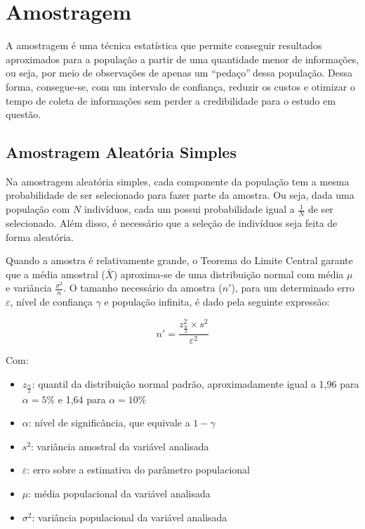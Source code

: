 \documentclass[
]{estat/estat}
\providecommand{\tightlist}{%
  \setlength{\itemsep}{0pt}\setlength{\parskip}{0pt}}\usepackage{longtable,booktabs,array}
\begin{document}
\section{Amostragem}\label{amostragem}

A amostragem é uma técnica estatística que permite conseguir resultados
aproximados para a população a partir de uma quantidade menor de
informações, ou seja, por meio de observações de apenas um
``pedaço''\(\:\)dessa população. Dessa forma, consegue-se, com um
intervalo de confiança, reduzir os custos e otimizar o tempo de coleta
de informações sem perder a credibilidade para o estudo em questão.

\subsection{Amostragem Aleatória
Simples}\label{amostragem-aleatuxf3ria-simples}

Na amostragem aleatória simples, cada componente da população tem a
mesma probabilidade de ser selecionado para fazer parte da amostra. Ou
seja, dada uma população com \(N\) indivíduos, cada um possui
probabilidade igual a \(\frac{1}{N}\) de ser selecionado. Além disso, é
necessário que a seleção de indivíduos seja feita de forma aleatória.

Quando a amostra é relativamente grande, o Teorema do Limite Central
garante que a média amostral (\(\bar{X}\)) aproxima-se de uma
distribuição normal com média \(\mu\) e variância
\(\frac{\sigma^2}{n}\). O tamanho necessário da amostra (\(n'\)), para
um determinado erro \(\varepsilon\), nível de confiança \(\gamma\) e
população infinita, é dado pela seguinte expressão:

\[
n' = \frac{z^2_{\frac{\alpha}{2}} \times s^2}{\varepsilon^2}
\]

Com:

\begin{itemize}
\tightlist
\item
  \(z_{\frac{\alpha}{2}}\): quantil da distribuição normal padrão,
  aproximadamente igual a 1,96 para \(\alpha = 5\%\) e 1,64 para
  \(\alpha = 10\%\)
\item
  \(\alpha\): nível de significância, que equivale a \(1 - \gamma\)
\item
  \(s^2\): variância amostral da variável analisada
\item
  \(\varepsilon\): erro sobre a estimativa do parâmetro populacional
\item
  \(\mu\): média populacional da variável analisada
\item
  \(\sigma^2\): variância populacional da variável analisada
\end{itemize}
\end{document}
